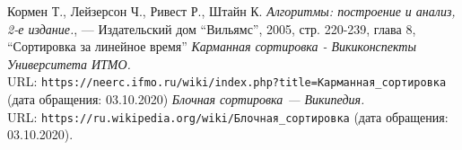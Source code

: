 \begin{thebibliography}{99}
Кормен Т., Лейзерсон Ч., Ривест Р., Штайн К. {\itshape Алгоритмы: построение и анализ, 2-е издание.}, --- Издательский дом \enquote{Вильямс}, 2005, стр.
220-239, глава 8, \enquote{Сортировка за линейное время}
{\itshape Карманная сортировка - Викиконспекты Университета ИТМО. } \\ URL: \texttt{https://neerc.ifmo.ru/wiki/index.php?title=Карманная\_сортировка} (дата обращения: 03.10.2020)
{\itshape Блочная сортировка — Википедия.} \\URL: \texttt{https://ru.wikipedia.org/wiki/Блочная\_сортировка} (дата обращения: 03.10.2020).
\end{thebibliography}
\pagebreak


